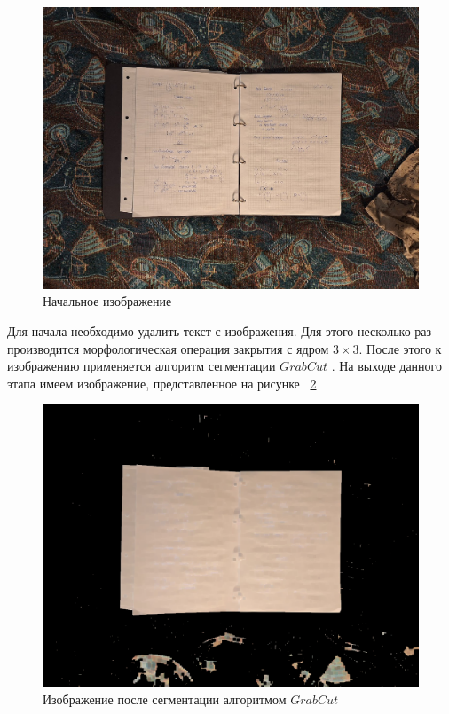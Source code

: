 \begin{figure}
    \includegraphics[scale=0.25]{img/input}
    \caption{Начальное изображение}
    \label{input}
\end{figure}

Для начала необходимо удалить текст с изображения. Для этого несколько раз производится морфологическая операция закрытия с ядром $3\times3$. 
После этого к изображению применяется алгоритм сегментации $GrabCut$ \cite{grab_cut}. На выходе данного этапа имеем изображение, представленное на рисунке ~\ref{grab_cut}

\begin{figure}
    \includegraphics[scale=0.25]{img/grab_cut}
    \caption{Изображение после сегментации алгоритмом $GrabCut$}
    \label{grab_cut}
\end{figure}

